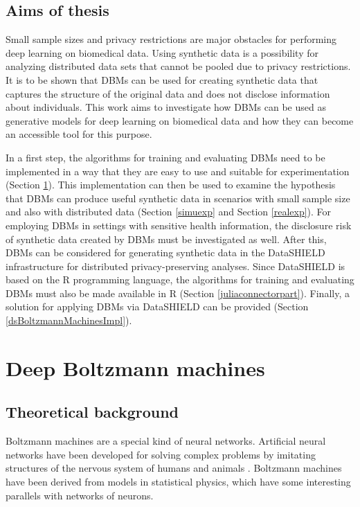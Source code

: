 \documentclass[12pt]{article}
\begin{document}
\subsection{Aims of thesis}

Small sample sizes and privacy restrictions are major obstacles for performing deep learning on biomedical data.
Using synthetic data is a possibility for analyzing distributed data sets that cannot be pooled due to privacy restrictions.
It is to be shown that DBMs can be used for creating synthetic data that captures the structure of the original data and does not disclose information about individuals.
This work aims to investigate how DBMs can be used as generative models for deep learning on biomedical data and how they can become an accessible tool for this purpose.

In a first step, the algorithms for training and evaluating DBMs need to be implemented in a way that they are easy to use and suitable for experimentation (Section \ref{bmpart}).
This implementation can then be used to examine the hypothesis that DBMs can produce useful synthetic data in scenarios with small sample size and also with distributed data (Section \ref{simuexp} and Section \ref{realexp}).
For employing DBMs in settings with sensitive health information, the disclosure risk of synthetic data created by DBMs must be investigated as well.
After this, DBMs can be considered for generating synthetic data in the DataSHIELD infrastructure for distributed privacy-preserving analyses.
Since DataSHIELD is based on the R programming language, the algorithms for training and evaluating DBMs must also be made available in R (Section \ref{juliaconnectorpart}).
Finally, a solution for applying DBMs via DataSHIELD can be provided (Section \ref{dsBoltzmannMachinesImpl}).


\clearpage
\section{Deep Boltzmann machines}\label{bmpart}
\subsection{Theoretical background}\label{bmtheory}

Boltzmann machines \citep{ackley_boltzmann_1985} are a special kind of neural networks.
Artificial neural networks have been developed for solving complex problems by imitating structures of the nervous system of humans and animals \citep{mcculloch_logical_1943}.
Boltzmann machines have been derived from models in statistical physics, which have some interesting parallels with networks of neurons.
\end{document}
